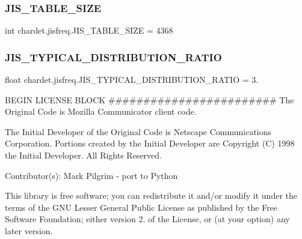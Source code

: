 \mbox{\label{namespacechardet_1_1jisfreq_ac347ecf8dd90f7d914686bd13bd69450}} 
\subsubsection{\texorpdfstring{J\+I\+S\+\_\+\+T\+A\+B\+L\+E\+\_\+\+S\+I\+ZE}{JIS\_TABLE\_SIZE}}
{\footnotesize\ttfamily int chardet.\+jisfreq.\+J\+I\+S\+\_\+\+T\+A\+B\+L\+E\+\_\+\+S\+I\+ZE = 4368}

\mbox{\label{namespacechardet_1_1jisfreq_a0786e8f75963476a3aed7cfab754746f}} 
\subsubsection{\texorpdfstring{J\+I\+S\+\_\+\+T\+Y\+P\+I\+C\+A\+L\+\_\+\+D\+I\+S\+T\+R\+I\+B\+U\+T\+I\+O\+N\+\_\+\+R\+A\+T\+IO}{JIS\_TYPICAL\_DISTRIBUTION\_RATIO}}
{\footnotesize\ttfamily float chardet.\+jisfreq.\+J\+I\+S\+\_\+\+T\+Y\+P\+I\+C\+A\+L\+\_\+\+D\+I\+S\+T\+R\+I\+B\+U\+T\+I\+O\+N\+\_\+\+R\+A\+T\+IO = 3.}



B\+E\+G\+IN L\+I\+C\+E\+N\+SE B\+L\+O\+CK \#\#\#\#\#\#\#\#\#\#\#\#\#\#\#\#\#\#\#\#\#\#\#\# The Original Code is Mozilla Communicator client code. 

The Initial Developer of the Original Code is Netscape Communications Corporation. Portions created by the Initial Developer are Copyright (C) 1998 the Initial Developer. All Rights Reserved.

Contributor(s)\+: Mark Pilgrim -\/ port to Python

This library is free software; you can redistribute it and/or modify it under the terms of the G\+NU Lesser General Public License as published by the Free Software Foundation; either version 2. of the License, or (at your option) any later version.


